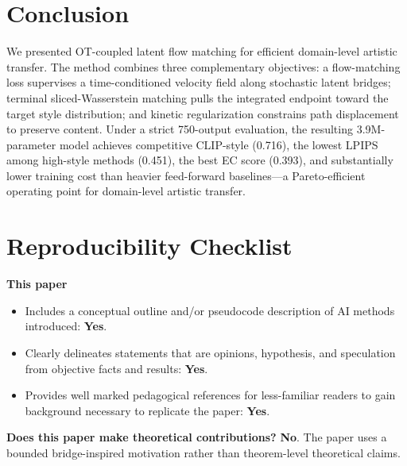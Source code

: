﻿\documentclass[letterpaper]{article}
\begin{document}
\section{Conclusion}
We presented OT-coupled latent flow matching for efficient domain-level artistic transfer. The method combines three complementary objectives: a flow-matching loss supervises a time-conditioned velocity field along stochastic latent bridges; terminal sliced-Wasserstein matching pulls the integrated endpoint toward the target style distribution; and kinetic regularization constrains path displacement to preserve content. Under a strict 750-output evaluation, the resulting 3.9M-parameter model achieves competitive CLIP-style (0.716), the lowest LPIPS among high-style methods (0.451), the best EC score (0.393), and substantially lower training cost than heavier feed-forward baselines---a Pareto-efficient operating point for domain-level artistic transfer.

\FloatBarrier


\clearpage
\small
\setlength{\itemsep}{1pt}
\setlength{\parskip}{2pt}
\section*{Reproducibility Checklist}
\noindent\textbf{This paper}
\begin{itemize}
\item Includes a conceptual outline and/or pseudocode description of AI methods introduced: \textbf{Yes}.
\item Clearly delineates statements that are opinions, hypothesis, and speculation from objective facts and results: \textbf{Yes}.
\item Provides well marked pedagogical references for less-familiar readers to gain background necessary to replicate the paper: \textbf{Yes}.
\end{itemize}

\noindent\textbf{Does this paper make theoretical contributions?} \textbf{No}. The paper uses a bounded bridge-inspired motivation rather than theorem-level theoretical claims.
\end{document}

